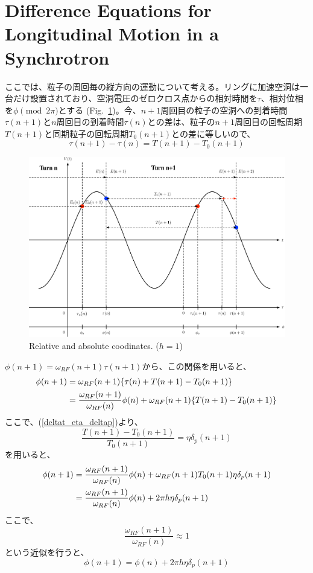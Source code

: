 \documentclass[10pt,a4paper]{ltjsarticle}
\begin{document}
\section{Difference Equations for Longitudinal Motion in a Synchrotron}
ここでは、粒子の周回毎の縦方向の運動について考える。リングに加速空洞は一台だけ設置されており、空洞電圧のゼロクロス点からの相対時間を$\tau$、相対位相を$\phi\pmod{2\pi}$とする (Fig.~\ref{coordinates})。今、$n+1$周回目の粒子の空洞への到着時間$\tau(n+1)$と$n$周回目の到着時間$\tau(n)$との差は、粒子の$n+1$周回目の回転周期$T(n+1)$と同期粒子の回転周期$T_0(n+1)$との差に等しいので、
%
\begin{equation}
  \tau(n+1) - \tau(n) = T(n+1) -T_0(n+1)
  \label{tau_T}
\end{equation}
%
\begin{figure}[hhbt]
  \begin{center}
    \includegraphics[width=15cm,clip]{coordinates.pdf}
    \caption{Relative and absolute coodinates. ($h=1$)}
    \label{coordinates}
  \end{center}
\end{figure}
%
$\phi(n+1) = \omega_{RF}(n+1) \tau(n+1)$から、この関係を用いると、
%
\begin{align}
  \phi(n+1) &=\omega_{RF}(n+1)\{\tau(n) + T(n+1) -T_0(n+1)\} \notag \\
    &= \frac{\omega_{RF}(n+1)}{\omega_{RF}(n)} \phi(n) + \omega_{RF}(n+1)\{T(n+1) -T_0(n+1)\}  \notag
\end{align}
%
ここで、(\ref{deltat_eta_deltap})より、
%
\begin{equation}
    \frac{T(n+1)-T_0(n+1)}{T_0(n+1)} = \eta \delta_p(n+1)
\end{equation}
%
を用いると、
%
\begin{align}
  \phi(n+1) &= \frac{\omega_{RF}(n+1)}{\omega_{RF}(n)}\phi(n) + \omega_{RF}(n+1)T_0(n+1)\eta \delta_p(n+1) \notag \\
  &=\frac{\omega_{RF}(n+1)}{\omega_{RF}(n)}\phi(n) + 2\pi h \eta \delta_p(n+1)
\end{align}
%
ここで、
%
\begin{equation}
  \frac{\omega_{RF}(n+1)}{\omega_{RF}(n)} \approx 1
\end{equation}
%
という近似を行うと、
%
\begin{equation}
  \phi(n+1) = \phi(n) + 2\pi h \eta \delta_p(n+1)
\end{equation}
\end{document}
